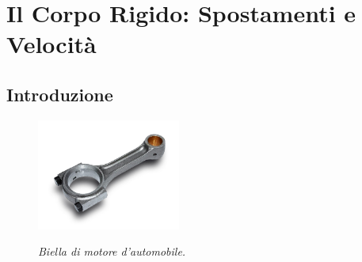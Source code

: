 \chapter{Il Corpo Rigido: Spostamenti e Velocit\`a}

\section{Introduzione}

\begin{figure}
     \begin{center}
     \includegraphics[width=0.42\textwidth]{part1/cinematica/FIG/f11.jpeg}
     \end{center}
\vskip -7.3mm
	\caption{\em Biella di motore d'automobile.}
     \label{fig:f11}
\end{figure}

